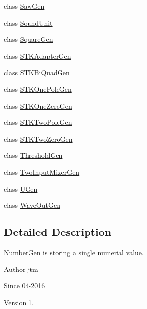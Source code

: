 \begin{DoxyCompactItemize}
class \hyperlink{classunit_1_1SawGen}{Saw\-Gen}
\item 
class \hyperlink{classunit_1_1SoundUnit}{Sound\-Unit}
\item 
class \hyperlink{classunit_1_1SquareGen}{Square\-Gen}
\item 
class \hyperlink{classunit_1_1STKAdapterGen}{S\-T\-K\-Adapter\-Gen}
\item 
class \hyperlink{classunit_1_1STKBiQuadGen}{S\-T\-K\-Bi\-Quad\-Gen}
\item 
class \hyperlink{classunit_1_1STKOnePoleGen}{S\-T\-K\-One\-Pole\-Gen}
\item 
class \hyperlink{classunit_1_1STKOneZeroGen}{S\-T\-K\-One\-Zero\-Gen}
\item 
class \hyperlink{classunit_1_1STKTwoPoleGen}{S\-T\-K\-Two\-Pole\-Gen}
\item 
class \hyperlink{classunit_1_1STKTwoZeroGen}{S\-T\-K\-Two\-Zero\-Gen}
\item 
class \hyperlink{classunit_1_1ThresholdGen}{Threshold\-Gen}
\item 
class \hyperlink{classunit_1_1TwoInputMixerGen}{Two\-Input\-Mixer\-Gen}
\item 
class \hyperlink{classunit_1_1UGen}{U\-Gen}
\item 
class \hyperlink{classunit_1_1WaveOutGen}{Wave\-Out\-Gen}
\end{DoxyCompactItemize}


\subsection{Detailed Description}
\hyperlink{classunit_1_1NumberGen}{Number\-Gen} is storing a single numerial value.

\begin{DoxyAuthor}{Author}
jtm 
\end{DoxyAuthor}
\begin{DoxySince}{Since}
04-\/2016 
\end{DoxySince}
\begin{DoxyVersion}{Version}
1. 
\end{DoxyVersion}
